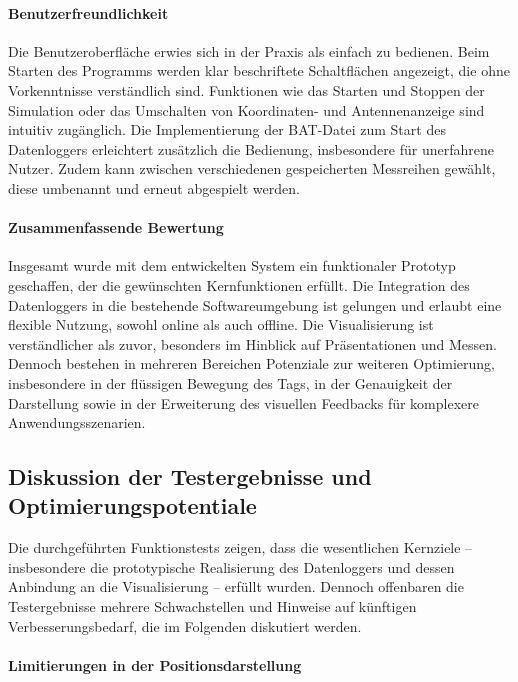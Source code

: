 \documentclass[a4paper, 12pt]{article} %
\begin{document}
\paragraph{Benutzerfreundlichkeit}
Die Benutzeroberfläche erwies sich in der Praxis als einfach zu bedienen. Beim Starten des Programms werden klar beschriftete Schaltflächen angezeigt, 
die ohne Vorkenntnisse verständlich sind. Funktionen wie das Starten und Stoppen der Simulation oder das Umschalten von Koordinaten- und Antennenanzeige 
sind intuitiv zugänglich. Die Implementierung der \ac{BAT}-Datei zum Start des Datenloggers erleichtert zusätzlich die Bedienung, insbesondere für unerfahrene
 Nutzer. Zudem kann zwischen verschiedenen gespeicherten Messreihen gewählt, diese umbenannt und erneut abgespielt werden.

\paragraph{Zusammenfassende Bewertung}
Insgesamt wurde mit dem entwickelten System ein funktionaler Prototyp geschaffen, der die gewünschten Kernfunktionen erfüllt. Die Integration des 
Datenloggers in die bestehende Softwareumgebung ist gelungen und erlaubt eine flexible Nutzung, sowohl online als auch offline. Die Visualisierung 
ist verständlicher als zuvor, besonders im Hinblick auf Präsentationen und Messen. Dennoch bestehen in mehreren Bereichen Potenziale zur weiteren 
Optimierung, insbesondere in der flüssigen Bewegung des Tags, in der Genauigkeit der Darstellung sowie in der Erweiterung des visuellen Feedbacks für
 komplexere Anwendungsszenarien.

\subsection{Diskussion der Testergebnisse und Optimierungspotentiale}

Die durchgeführten Funktionstests zeigen, dass die wesentlichen Kernziele – insbesondere die prototypische Realisierung des Datenloggers und 
dessen Anbindung an die Visualisierung – erfüllt wurden. Dennoch offenbaren die Testergebnisse mehrere Schwachstellen und Hinweise auf künftigen 
Verbesserungsbedarf, die im Folgenden diskutiert werden.

\paragraph{Limitierungen in der Positionsdarstellung}
\end{document}
